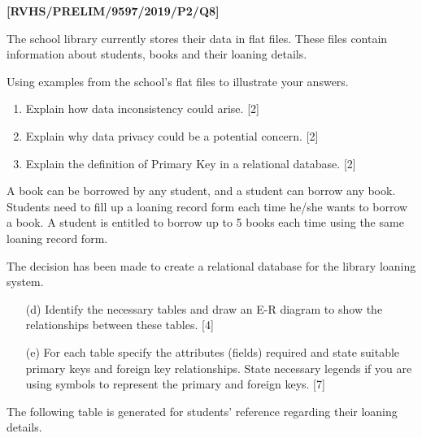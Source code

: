 \item \textbf{{[}RVHS/PRELIM/9597/2019/P2/Q8{]} }

The school library currently stores their data in flat files. These
files contain information about students, books and their loaning
details. 

Using examples from the school\textquoteright s flat files to illustrate
your answers.
\begin{enumerate}
\item Explain how data inconsistency could arise.\hfill{} {[}2{]}
\item Explain why data privacy could be a potential concern.\hfill{} {[}2{]}
\item Explain the definition of Primary Key in a relational database. \hfill{}{[}2{]}
\end{enumerate}
A book can be borrowed by any student, and a student can borrow any
book. Students need to fill up a loaning record form each time he/she
wants to borrow a book. A student is entitled to borrow up to 5 books
each time using the same loaning record form.

The decision has been made to create a relational database for the
library loaning system.
\begin{enumerate}
\item[(d)]  Identify the necessary tables and draw an E-R diagram to show the
relationships between these tables. {[}4{]}
\item[(e)]  For each table specify the attributes (fields) required and state
suitable primary keys and foreign key relationships. State necessary
legends if you are using symbols to represent the primary and foreign
keys. {[}7{]}
\end{enumerate}
The following table is generated for students\textquoteright{} reference
regarding their loaning details.

